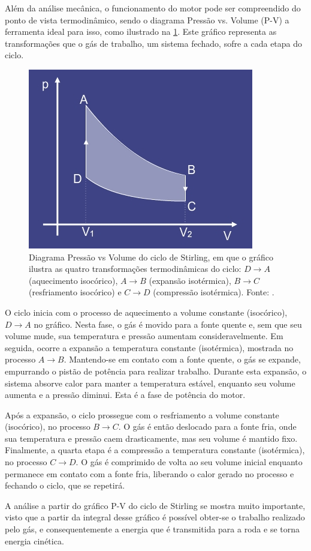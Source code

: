 Além da análise mecânica, o funcionamento do motor pode ser compreendido do ponto de vista termodinâmico, sendo o diagrama Pressão vs. Volume (P-V) a ferramenta ideal para isso, como ilustrado na \cref{CicloStirling}. Este gráfico representa as transformações que o gás de trabalho, um sistema fechado, sofre a cada etapa do ciclo.

\begin{figure}[H]
	\centering
	\includegraphics[width=0.30\linewidth]{fig/CicloStirling.png}
	\caption{Diagrama Pressão vs Volume do ciclo de Stirling, em que o gráfico ilustra as quatro transformações termodinâmicas do ciclo: \(D \rightarrow A\) (aquecimento isocórico), \(A \rightarrow B\) (expansão isotérmica), \(B \rightarrow C\) (resfriamento isocórico) e \(C \rightarrow D\) (compressão isotérmica). Fonte: \cite{CicloDeStirling}.}
	\label{CicloStirling}
\end{figure}

O ciclo inicia com o processo de aquecimento a volume constante (isocórico), \(D \rightarrow A\) no gráfico. Nesta fase, o gás é movido para a fonte quente e, sem que seu volume mude, sua temperatura e pressão aumentam consideravelmente. Em seguida, ocorre a expansão a temperatura constante (isotérmica), mostrada no processo \(A \rightarrow B\). Mantendo-se em contato com a fonte quente, o gás se expande, empurrando o pistão de potência para realizar trabalho. Durante esta expansão, o sistema absorve calor para manter a temperatura estável, enquanto seu volume aumenta e a pressão diminui. Esta é a fase de potência do motor.

Após a expansão, o ciclo prossegue com o resfriamento a volume constante (isocórico), no processo \(B \rightarrow C\). O gás é então deslocado para a fonte fria, onde sua temperatura e pressão caem drasticamente, mas seu volume é mantido fixo. Finalmente, a quarta etapa é a compressão a temperatura constante (isotérmica), no processo \(C \rightarrow D\). O gás é comprimido de volta ao seu volume inicial enquanto permanece em contato com a fonte fria, liberando o calor gerado no processo e fechando o ciclo, que se repetirá.

A análise a partir do gráfico P-V do ciclo de Stirling se mostra muito importante, visto que a partir da integral desse gráfico é possível obter-se o trabalho realizado pelo gás, e consequentemente a energia que é transmitida para a roda e se torna energia cinética.

